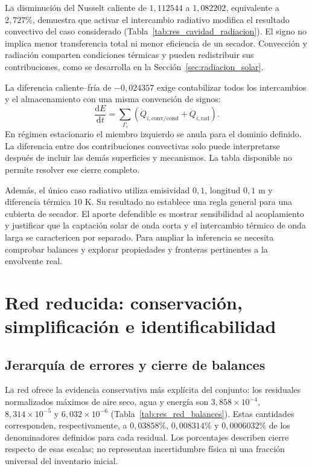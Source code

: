 La disminución del Nusselt caliente de $1{,}112544$ a $1{,}082202$, equivalente a $2{,}727\%$, demuestra que activar el intercambio radiativo modifica el resultado convectivo del caso considerado (Tabla~\ref{tab:res_cavidad_radiacion}). El signo no implica menor transferencia total ni menor eficiencia de un secador. Convección y radiación comparten condiciones térmicas y pueden redistribuir sus contribuciones, como se desarrolla en la Sección~\ref{sec:radiacion_solar}.

La diferencia caliente--fría de $-0{,}024357$ exige contabilizar todos los intercambios y el almacenamiento con una misma convención de signos:
\begin{equation}
\frac{\mathrm dE}{\mathrm dt}=
\sum_{\Gamma_i}\left(
\dot Q_{i,\mathrm{conv/cond}}+\dot Q_{i,\mathrm{rad}}\right).
\label{eq:dis_balance_radiativo}
\end{equation}
En régimen estacionario el miembro izquierdo se anula para el dominio definido. La diferencia entre dos contribuciones convectivas solo puede interpretarse después de incluir las demás superficies y mecanismos. La tabla disponible no permite resolver ese cierre completo.

Además, el único caso radiativo utiliza emisividad $0{,}1$, longitud $0{,}1$ m y diferencia térmica $10$ K. Su resultado no establece una regla general para una cubierta de secador. El aporte defendible es mostrar sensibilidad al acoplamiento y justificar que la captación solar de onda corta y el intercambio térmico de onda larga se caractericen por separado. Para ampliar la inferencia se necesita comprobar balances y explorar propiedades y fronteras pertinentes a la envolvente real.
\FloatBarrier

\section{Red reducida: conservación, simplificación e identificabilidad}
\label{dis:red}

\subsection{Jerarquía de errores y cierre de balances}

La red ofrece la evidencia conservativa más explícita del conjunto: los residuales normalizados máximos de aire seco, agua y energía son $3{,}858\times10^{-4}$, $8{,}314\times10^{-5}$ y $6{,}032\times10^{-6}$ (Tabla~\ref{tab:res_red_balances}). Estas cantidades corresponden, respectivamente, a $0{,}03858\%$, $0{,}008314\%$ y $0{,}0006032\%$ de los denominadores definidos para cada residual. Los porcentajes describen cierre respecto de esas escalas; no representan incertidumbre física ni una fracción universal del inventario inicial.


